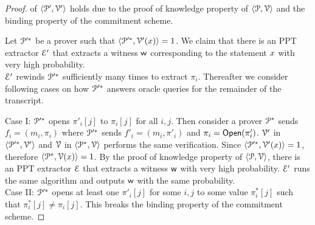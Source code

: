 \begin{proof}
	 of $\langle \mathcal{P}',\mathcal{V}'\rangle$ holds due to the proof of knowledge property of $\langle \mathcal{P},\mathcal{V}\rangle$ and the binding property of the commitment scheme.
	
	Let $\mathcal{P}'^\ast$ be a prover such that $\langle \mathcal{P}'^\ast,\mathcal{V}'({x})\rangle = 1$. We claim that there is an PPT extractor $\mathcal{E}'$ that extracts a witness $\mathsf{w}$ corresponding to the statement ${x}$ with very high probability.\\
	$\mathcal{E}'$ rewinds $\mathcal{P}'^\ast$ sufficiently many times to extract $\pi_i$. Thereafter we consider following cases on how $\mathcal{P}'^\ast$ answers oracle queries for the remainder of the transcript.	
	
	Case I: $\mathcal{P}'^\ast$ opens $\pi'_i[j]$ to $\pi_i[j]$ for all $i,j$. Then consider a prover $\mathcal{P}^\ast$ sends $f_i = (m_i,\pi_i)$ where  $\mathcal{P}'^\ast$ sends $f'_i = (m_i,\pi'_i)$ and $\pi_i = \mathsf{Open}(\pi'_i)$.
	$\mathcal{V}'$ in $\langle \mathcal{P}'^\ast,\mathcal{V}'\rangle$ and $\mathcal{V}$ in $\langle \mathcal{P}^\ast,\mathcal{V}\rangle$ performs the same verification. Since $\langle \mathcal{P}'^\ast,\mathcal{V}'({x})\rangle = 1$, therefore $\langle \mathcal{P}^\ast,\mathcal{V}({x})\rangle = 1$. By the proof of knowledge property of $\langle \mathcal{P},\mathcal{V}\rangle$, there is an PPT extractor $\mathcal{E}$ that extracts a witness $\mathsf{w}$ with very high probability. $\mathcal{E}'$ runs the same algorithm and outputs $\mathsf{w}$ with the same probability.\\
	Case II: $\mathcal{P}'^\ast$ opens at least one $\pi'_i[j]$ for some $i,j$ to some value $\pi^\ast_i[j]$ such that $\pi^\ast_i[j] \neq \pi_i[j]$. 
	This breaks the binding property of the commitment scheme.
	

\end{proof}
